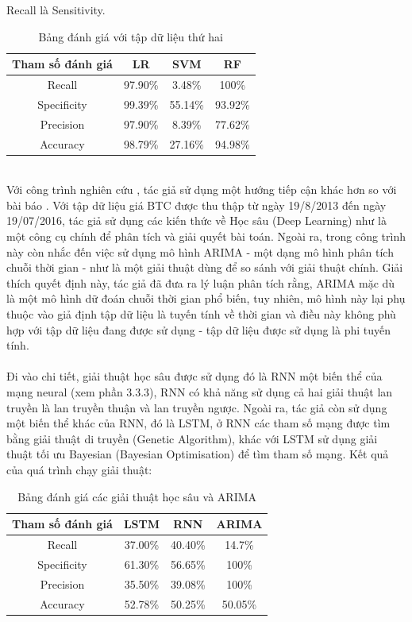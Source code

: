 Recall là Sensitivity.
\begin{table}[h]
\centering
\begin{tabular}{ |c|c|c|c| }
\hline
Tham số đánh giá & LR & SVM & RF \\
\hline
Recall & 97.90\% & 3.48\% & 100\% \\
\hline
Specificity & 99.39\% & 55.14\% & 93.92\% \\
\hline
Precision & 97.90\% & 8.39\% & 77.62\% \\
\hline
Accuracy & 98.79\% & 27.16\% & 94.98\% \\
\hline
\end{tabular}
\caption{Bảng đánh giá với tập dữ liệu thứ hai}
\end{table}\\
Với công trình nghiên cứu \cite{PredictingThePriceOfBitcoin}, tác giả sử dụng 
một hướng tiếp cận khác hơn so với bài báo \cite{AutomatedBitcoinTrading}. Với 
tập dữ liệu giá BTC được thu thập từ ngày 19/8/2013 đến ngày 19/07/2016, tác 
giả sử dụng các kiến thức về Học sâu (Deep Learning) như là một công cụ chính 
để phân tích và giải quyết bài toán. Ngoài ra, trong công trình này còn nhắc 
đến việc sử dụng mô hình ARIMA - một dạng mô hình phân tích chuỗi thời gian - 
như là một giải thuật dùng để so sánh với giải thuật chính. Giải thích quyết 
định này, tác giả đã đưa ra lý luận phân tích rằng, ARIMA mặc dù là một mô hình 
dữ đoán chuỗi thời gian phổ biến, tuy nhiên, mô hình này lại phụ thuộc vào giả 
định tập dữ liệu là tuyến tính về thời gian và điều này không phù hợp với tập 
dữ liệu đang được sử dụng - tập dữ liệu được sử dụng là phi tuyến tính.\\\\
Đi vào chi tiết, giải thuật học sâu được sử dụng đó là RNN một biến thể của 
mạng neural (xem phần 3.3.3), RNN có khả năng sử dụng cả hai giải thuật lan 
truyền là lan truyền thuận và lan truyền ngược. Ngoài ra, tác giả còn sử dụng 
một biến thể khác của RNN, đó là LSTM, ở RNN các tham số mạng được tìm bằng 
giải thuật di truyền (Genetic Algorithm), khác với LSTM sử dụng giải thuật tối 
ưu Bayesian (Bayesian Optimisation) để tìm tham số mạng. Kết quả của quá trình 
chạy giải thuật:
\begin{table}[h]
\centering
\begin{tabular}{ |c|c|c|c| }
\hline
Tham số đánh giá & LSTM & RNN & ARIMA \\
\hline
Recall & 37.00\% & 40.40\% & 14.7\% \\
\hline
Specificity & 61.30\% & 56.65\% & 100\% \\
\hline
Precision & 35.50\% & 39.08\% & 100\% \\
\hline
Accuracy & 52.78\% & 50.25\% & 50.05\% \\
\hline
\end{tabular}
\caption{Bảng đánh giá các giải thuật học sâu và ARIMA}
\end{table}\\
